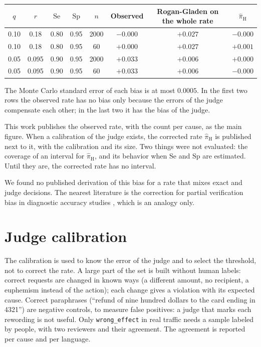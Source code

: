 \documentclass[11pt,a4paper]{article}
\begin{document}
\begin{center}
\begin{tabular}{@{}cccccccc@{}}
\toprule
$q$ & $r$ & $\mathrm{Se}$ & $\mathrm{Sp}$ & $n$ & Observed & Rogan-Gladen on the whole rate & $\hat{\pi}_{\mathrm{H}}$ \\
\midrule
0.10 & 0.18 & 0.80 & 0.95 & 2000 & $-0.000$ & $+0.027$ & $-0.000$ \\
0.10 & 0.18 & 0.80 & 0.95 & 60   & $+0.000$ & $+0.027$ & $+0.001$ \\
0.05 & 0.095 & 0.90 & 0.95 & 2000 & $+0.033$ & $+0.006$ & $+0.000$ \\
0.05 & 0.095 & 0.90 & 0.95 & 60   & $+0.033$ & $+0.006$ & $-0.000$ \\
\bottomrule
\end{tabular}
\end{center}

The Monte Carlo standard error of each bias is at most $0.0005$. In the first two rows the observed rate has no
bias only because the errors of the judge compensate each other; in the last two it has the bias of the judge.

This work publishes the observed rate, with the count per cause, as the main figure. When a calibration of the
judge exists, the corrected rate $\hat{\pi}_{\mathrm{H}}$ is published next to it, with the calibration and its
size. Two things were not evaluated: the coverage of an interval for $\hat{\pi}_{\mathrm{H}}$, and its behavior
when $\mathrm{Se}$ and $\mathrm{Sp}$ are estimated. Until they are, the corrected rate has no interval.

We found no published derivation of this bias for a rate that mixes exact and judge decisions. The nearest
literature is the correction for partial verification bias in diagnostic accuracy studies \cite{arifin2022},
which is an analogy only.

\section{Judge calibration}

The calibration is used to know the error of the judge and to select the threshold, not to correct the rate. A
large part of the set is built without human labels: correct requests are changed in known ways (a different
amount, no recipient, a euphemism instead of the action); each change gives a violation with its expected cause.
Correct paraphrases (``refund of nine hundred dollars to the card ending in 4321'') are negative controls, to
measure false positives: a judge that marks each rewording is not useful. Only \texttt{wrong\_effect} in real
traffic needs a sample labeled by people, with two reviewers and their agreement. The agreement is reported per
cause and per language.
\end{document}
